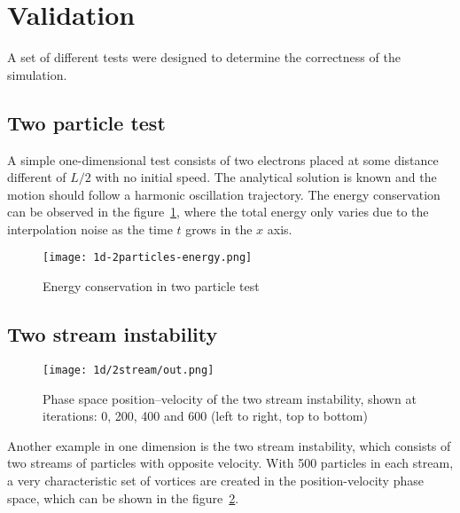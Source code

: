 \section{Validation}

A set of different tests were designed to determine the correctness of the
simulation.

\subsection{Two particle test}

A simple one-dimensional test consists of two electrons placed at some distance 
different of $L/2$ with no initial speed. The analytical solution is known and 
the motion should follow a harmonic oscillation trajectory. The energy 
conservation can be observed in the figure~\ref{fig:1d-2particles-energy}, where 
the total energy only varies due to the interpolation noise as the time $t$ 
grows in the $x$ axis.
%
\begin{figure}[h]
	\centering
	\texttt{[image: 1d-2particles-energy.png]}
	\caption{Energy conservation in two particle test}
	\label{fig:1d-2particles-energy}
\end{figure}

\subsection{Two stream instability}

%
\begin{figure}[ht]
	\centering
	\texttt{[image: 1d/2stream/out.png]}
	\caption{Phase space position--velocity of the two stream instability, shown 
	at iterations: 0, 200, 400 and 600 (left to right, top to bottom)}
	\label{fig:1d-2stream}
\end{figure}

Another example in one dimension is the two stream instability, which consists 
of two streams of particles with opposite velocity. With 500 particles in each 
stream, a very characteristic set of vortices are created in the 
position-velocity phase space, which can be shown in the 
figure~\ref{fig:1d-2stream}.
